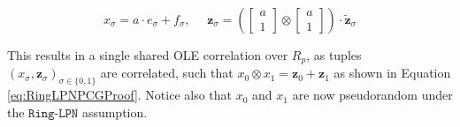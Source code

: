 \begin{equation}
x_\sigma = a\cdot e_\sigma + f_\sigma,
\:\:\:\:\:\:
\mathbf{z}_\sigma = \left(\begin{bmatrix} a \\ 1 \end{bmatrix} \otimes \begin{bmatrix} a \\ 1 \end{bmatrix} \right) \cdot \tilde{\mathbf{z}}_\sigma
\label{eq:imroved_pcg}
\end{equation}

This results in a single shared OLE correlation over $R_p$, as tuples $(x_\sigma, \mathbf{z}_\sigma)_{\sigma\in\{0,1\}}$ are correlated, such that $x_0\otimes x_1 = \mathbf{z}_0 + \mathbf{z}_1$ as shown in Equation \ref{eq:RingLPNPCGProof}. Notice also that $x_0$ and $x_1$ are now pseudorandom under the $\texttt{Ring-LPN}$ assumption.

